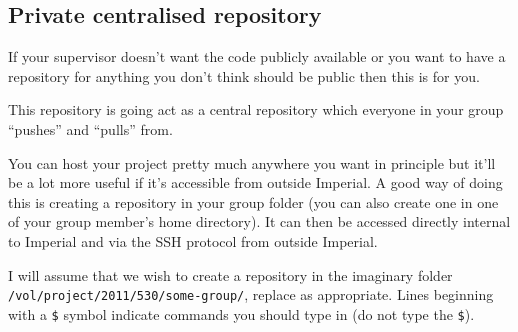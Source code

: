 \documentclass[a4paper,10pt,fleqn]{article}
\begin{document}
		\subsection{Private centralised repository}
		If your supervisor doesn't want the code publicly available or you want to have a repository for anything you don't think should be public then this is for you.

		This repository is going act as a central repository which everyone in your group ``pushes'' and ``pulls'' from. 

		You can host your project pretty much anywhere you want in principle but it'll be a lot more useful if it's accessible from outside Imperial. A good way of doing this is creating a repository in your group folder (you can also create one in one of your group member's home directory). It can then be accessed directly internal to Imperial and via the SSH protocol from outside Imperial.

		I will assume that we wish to create a repository in the imaginary folder \texttt{/vol/project/2011/530/some-group/}, replace as appropriate. Lines beginning with a \texttt{\$} symbol indicate commands you should type in (do not type the \texttt{\$}).
\end{document}
